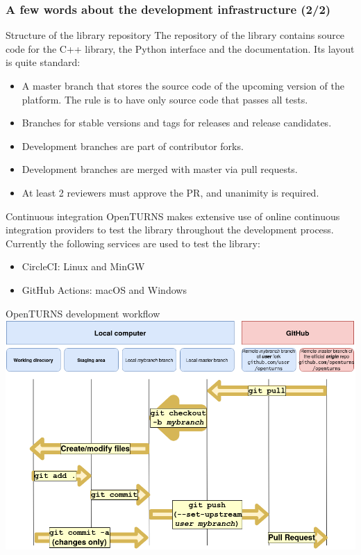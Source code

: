 \documentclass[8pt]{beamer}
\begin{document}
\begin{frame}
    \frametitle{A few words about the development infrastructure (2/2)}
    \begin{block}{Structure of the library repository}
    The repository of the library contains source code for the C++ library, the Python interface and the documentation. Its layout is quite standard:
    \begin{itemize}
    \item A \alert{master branch} that stores the source code of the upcoming version of the platform. The rule is to have only source code that passes all tests.
    \item Branches for \alert{stable versions} and \alert{tags for releases} and release candidates.
    \item Development branches are part of \alert{contributor forks}.
    \item Development branches are merged with master via \alert{pull requests}.
    \item At least \alert{2 reviewers must approve} the PR, and unanimity is required.
    \end{itemize}
  \end{block}

  \begin{block}{Continuous integration}
    OpenTURNS makes extensive use of online continuous integration providers to \alert{test the library} throughout the development process. Currently the following services are used to test the library:
    \begin{itemize}
    \item CircleCI: Linux and MinGW
    \item GitHub Actions: macOS and Windows
    \end{itemize}
  \end{block}
\end{frame}

\begin{frame}{OpenTURNS development workflow}
    \includegraphics[width=\textwidth]{Git_flow.png}
\end{frame}
\end{document}
